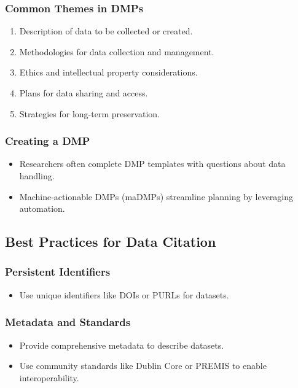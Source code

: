 \subsubsection{Common Themes in DMPs}
\begin{enumerate}
    \item Description of data to be collected or created.
    \item Methodologies for data collection and management.
    \item Ethics and intellectual property considerations.
    \item Plans for data sharing and access.
    \item Strategies for long-term preservation.
\end{enumerate}

\subsubsection{Creating a DMP}
\begin{itemize}
    \item Researchers often complete DMP templates with questions about data handling.
    \item Machine-actionable DMPs (maDMPs) streamline planning by leveraging automation.
\end{itemize}

\subsection{Best Practices for Data Citation}
\subsubsection{Persistent Identifiers}
\begin{itemize}
    \item Use unique identifiers like DOIs or PURLs for datasets.
\end{itemize}

\subsubsection{Metadata and Standards}
\begin{itemize}
    \item Provide comprehensive metadata to describe datasets.
    \item Use community standards like Dublin Core or PREMIS to enable interoperability.
\end{itemize}

